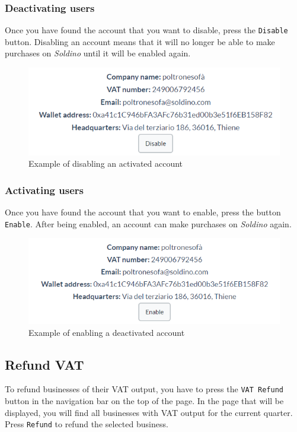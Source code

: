 		\subsubsection{Deactivating users}
		Once you have found the account that you want to disable, press the 
		\texttt{Disable} button. Disabling an account means that it will no longer be able to make purchases on \textit{Soldino} 
		until it will be enabled again.

		\begin{figure}[H]
			\includegraphics[width=15cm]{res/images/user_disable.png}
			\centering
			\caption{Example of disabling an activated account}
		\end{figure}
		\subsubsection{Activating users}
		Once you have found the account that you want to enable, press the button 
		\texttt{Enable}. After being enabled, an account can make 
		purchases on \textit{Soldino} again.
		\begin{figure}[H]
			\includegraphics[width=15cm]{res/images/user_enable.png}
			\centering
			\caption{Example of enabling a deactivated account}
		\end{figure}
		
	\subsection{Refund VAT}
	To refund businesses of their VAT output, you have to press the \texttt{VAT 
	Refund} button in the navigation bar on the top of the page. In the 
	page that will be displayed, you will find all businesses with VAT output for the current quarter.
	Press \texttt{Refund} to refund the selected business.

